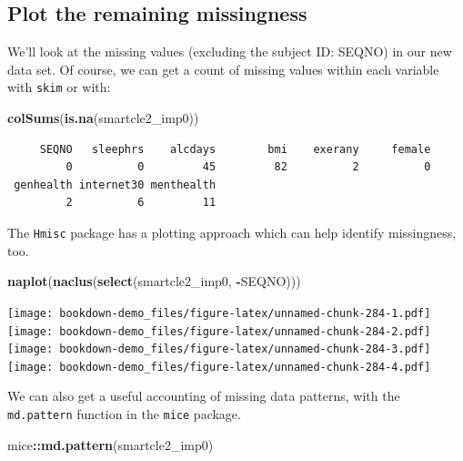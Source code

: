 \documentclass[]{book}
\newenvironment{Shaded}{\begin{snugshade}}{\end{snugshade}}
\newcommand{\KeywordTok}[1]{\textcolor[rgb]{0.13,0.29,0.53}{\textbf{#1}}}
\newcommand{\OperatorTok}[1]{\textcolor[rgb]{0.81,0.36,0.00}{\textbf{#1}}}
\newcommand{\NormalTok}[1]{#1}
\theoremstyle{definition}
\theoremstyle{definition}
\theoremstyle{definition}
\theoremstyle{remark}
\begin{document}
\subsection{Plot the remaining
missingness}\label{plot-the-remaining-missingness-1}

We'll look at the missing values (excluding the subject ID: SEQNO) in
our new data set. Of course, we can get a count of missing values within
each variable with \texttt{skim} or with:

\begin{Shaded}
\begin{Highlighting}[]
\KeywordTok{colSums}\NormalTok{(}\KeywordTok{is.na}\NormalTok{(smartcle2_imp0))}
\end{Highlighting}
\end{Shaded}

\begin{verbatim}
     SEQNO   sleephrs    alcdays        bmi    exerany     female 
         0          0         45         82          2          0 
 genhealth internet30 menthealth 
         2          6         11 
\end{verbatim}

The \texttt{Hmisc} package has a plotting approach which can help
identify missingness, too.

\begin{Shaded}
\begin{Highlighting}[]
\KeywordTok{naplot}\NormalTok{(}\KeywordTok{naclus}\NormalTok{(}\KeywordTok{select}\NormalTok{(smartcle2_imp0, }\OperatorTok{-}\NormalTok{SEQNO)))}
\end{Highlighting}
\end{Shaded}

\texttt{[image: bookdown-demo\_files/figure-latex/unnamed-chunk-284-1.pdf]}
\texttt{[image: bookdown-demo\_files/figure-latex/unnamed-chunk-284-2.pdf]}
\texttt{[image: bookdown-demo\_files/figure-latex/unnamed-chunk-284-3.pdf]}
\texttt{[image: bookdown-demo\_files/figure-latex/unnamed-chunk-284-4.pdf]}

We can also get a useful accounting of missing data patterns, with the
\texttt{md.pattern} function in the \texttt{mice} package.

\begin{Shaded}
\begin{Highlighting}[]
\NormalTok{mice}\OperatorTok{::}\KeywordTok{md.pattern}\NormalTok{(smartcle2_imp0)}
\end{Highlighting}
\end{Shaded}
\end{document}
